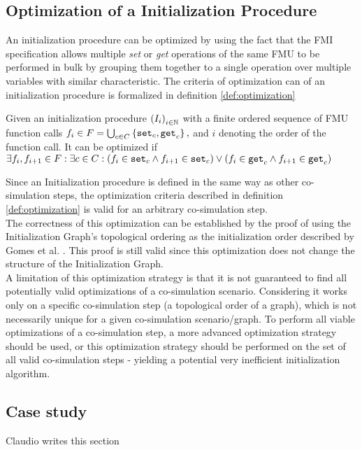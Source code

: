 \documentclass[runningheads]{llncs}
\begin{document}
\subsection{Optimization of a Initialization Procedure}
An initialization procedure can be optimized by using the fact that the FMI specification allows multiple \textit{set} or \textit{get} operations of the same FMU to be performed in bulk by grouping them together to a single operation over multiple variables with similar characteristic. The criteria of optimization can of an initialization procedure is formalized in definition \ref{def:optimization}
\begin{definition}\label{def:optimization}
  Given an initialization procedure $ \left( I_i \right)_{i \in \mathbb{N}}$ with a finite ordered sequence of FMU function calls $f_i \in F = \bigcup_{c \in C}  \left\{ \mathtt{set}_{c},\mathtt{get}_{c} \right\},$ and $i$ denoting the order of the function call. It can be optimized if $\exists f_i, f_{i +1} \in F : \exists c \in C :(f_i \in {\mathtt{set}_{c}} \land f_{i+1} \in {\mathtt{set}_{c}}) \lor (f_i \in {\mathtt{get}_{c}} \land f_{i+1} \in {\mathtt{get}_{c}})$
\end{definition}
Since an Initialization procedure is defined in the same way as other co-simulation steps, the optimization criteria described in definition \ref{def:optimization} is valid for an arbitrary co-simulation step. \\
The correctness of this optimization can be established by the proof of using the Initialization Graph's topological ordering as the initialization order described by Gomes et al. \cite{Gomes2019}. This proof is still valid since this optimization does not change the structure of the Initialization Graph. \\
A limitation of this optimization strategy is that it is not guaranteed to find all potentially valid optimizations of a co-simulation scenario. Considering it works only on a specific co-simulation step (a topological order of a graph), which is not necessarily unique for a given co-simulation scenario/graph. To perform all viable optimizations of a co-simulation step, a more advanced optimization strategy should be used, or this optimization strategy should be performed on the set of all valid co-simulation steps - yielding a potential very inefficient initialization algorithm.



\subsection{Case study}
Claudio writes this section 






%



\end{document}
